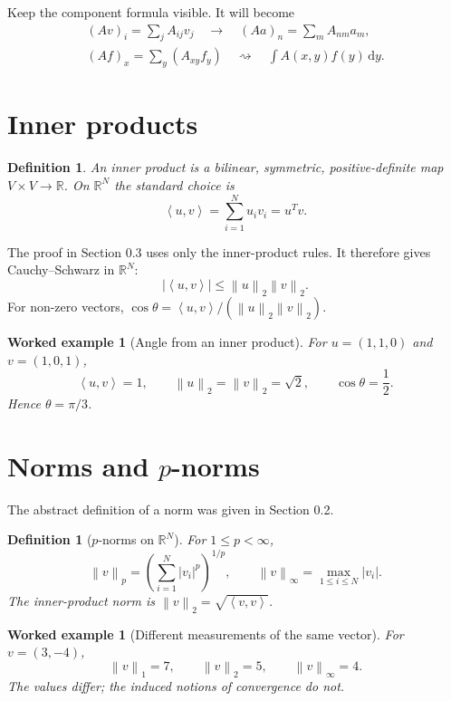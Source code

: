 \documentclass[11pt,a5paper,oneside,openany]{scrreprt}
\theoremstyle{notes}
\theoremstyle{definitions}
\newtheorem{definition}[theorem]{Definition}
\newtheorem{example}[theorem]{Worked example}
\newcommand{\R}{\mathbb{R}}
\newcommand{\ip}[2]{\left\langle #1,#2\right\rangle}
\newcommand{\norm}[1]{\left\lVert #1\right\rVert}
\newcommand{\dd}{\,\mathrm{d}}
\begin{document}
\begin{bridge}
Keep the component formula visible.  It will become
\[
 \begin{gathered}
 (Av)_i=\sum_jA_{ij}v_j
 \quad\longrightarrow\quad
 (Aa)_n=\sum_mA_{nm}a_m,\\[2mm]
 (Af)_x=\sum_y(A_{xy}f_y)
 \quad\rightsquigarrow\quad \int A(x,y)f(y)\dd y.
 \end{gathered}
\]
\end{bridge}

\section{Inner products}

\begin{definition}
An inner product is a bilinear, symmetric, positive-definite map
$V\times V\to\R$.  On $\R^N$ the standard choice is
\[
  \boxed{\ip{u}{v}=\sum_{i=1}^{N}u_iv_i=u^Tv}.
\]
\end{definition}

The proof in Section 0.3 uses only the inner-product rules.  It therefore gives
Cauchy--Schwarz in $\R^N$:
\[
 |\ip{u}{v}|\le\norm{u}_2\norm{v}_2.
\]
For non-zero vectors,
$\cos\theta=\ip{u}{v}/(\norm{u}_2\norm{v}_2)$.

\begin{example}[Angle from an inner product]
For $u=(1,1,0)$ and $v=(1,0,1)$,
\[
 \ip{u}{v}=1,
 \qquad \norm{u}_2=\norm{v}_2=\sqrt2,
 \qquad \cos\theta=\frac12.
\]
Hence $\theta=\pi/3$.
\end{example}

\newpage
\section{Norms and $p$-norms}

The abstract definition of a norm was given in Section 0.2.

\begin{definition}[$p$-norms on $\R^N$]
For $1\le p<\infty$,
\[
 \norm{v}_p=\left(\sum_{i=1}^{N}|v_i|^p\right)^{1/p},
 \qquad
 \norm{v}_{\infty}=\max_{1\le i\le N}|v_i|.
\]
The inner-product norm is $\norm{v}_2=\sqrt{\ip{v}{v}}$.
\end{definition}

\begin{example}[Different measurements of the same vector]
For $v=(3,-4)$,
\[
  \norm{v}_1=7,\qquad \norm{v}_2=5,
  \qquad \norm{v}_{\infty}=4.
\]
The values differ; the induced notions of convergence do not.
\end{example}
\end{document}
